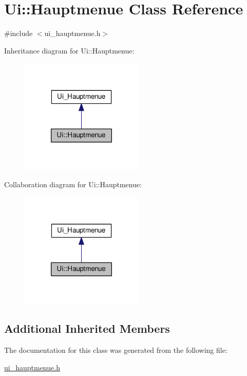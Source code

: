 \hypertarget{classUi_1_1Hauptmenue}{\section{Ui\-:\-:Hauptmenue Class Reference}
\label{classUi_1_1Hauptmenue}
}


{\ttfamily \#include $<$ui\-\_\-hauptmenue.\-h$>$}



Inheritance diagram for Ui\-:\-:Hauptmenue\-:\nopagebreak
\begin{figure}[H]
\begin{center}
\leavevmode
\includegraphics[width=166pt]{classUi_1_1Hauptmenue__inherit__graph}
\end{center}
\end{figure}


Collaboration diagram for Ui\-:\-:Hauptmenue\-:\nopagebreak
\begin{figure}[H]
\begin{center}
\leavevmode
\includegraphics[width=166pt]{classUi_1_1Hauptmenue__coll__graph}
\end{center}
\end{figure}
\subsection*{Additional Inherited Members}


The documentation for this class was generated from the following file\-:\begin{DoxyCompactItemize}
\item 
\hyperlink{ui__hauptmenue_8h}{ui\-\_\-hauptmenue.\-h}\end{DoxyCompactItemize}
